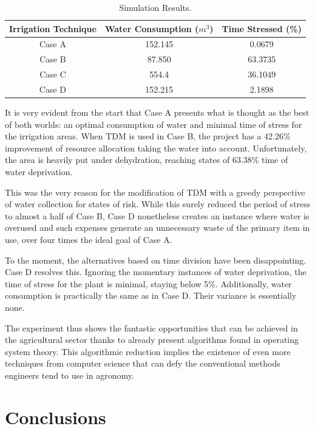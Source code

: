 \documentclass[12pt]{article}
\begin{document}
\begin{table}[ht]
\centering

\begin{tabular}{|c||c|c|}
\hline
Irrigation Technique & Water Consumption ($m^3$) & Time Stressed (\%)\\
\hline \hline
Case A & 152.145 & 0.0679 \\
\hline
Case B & 87.850 & 63.3735 \\
\hline
Case C & 554.4 & 36.1049 \\
\hline
Case D & 152.215 & 2.1898 \\
\hline
\end{tabular}

\caption{Simulation Results.}
\label{tab:results}
\end{table}

It is very evident from the start that Case A presents what is thought as the best of both worlds: an optimal consumption of water and minimal time of stress for the irrigation areas. When TDM is used in Case B, the project has a 42.26\% improvement of resource allocation taking the water into account. Unfortunately, the area is heavily put under dehydration, reaching states of 63.38\% time of water deprivation. 

This was the very reason for the modification of TDM with a greedy perspective of water collection for states of risk. While this surely reduced the period of stress to almost a half of Case B, Case D nonetheless creates an instance where water is overused and such expenses generate an unnecessary waste of the primary item in use, over four times the ideal goal of Case A.

To the moment, the alternatives based on time division have been disappointing. Case D resolves this. Ignoring the momentary instances of water deprivation, the time of stress for the plant is minimal, staying below 5\%. Additionally, water consumption is practically the same as in Case D. Their variance is essentially none.

The experiment thus shows the fantastic opportunities that can be achieved in the agricultural sector thanks to already present algorithms found in operating system theory. This algorithmic reduction implies the existence of even more techniques from computer science that can defy the conventional methods engineers tend to use in agronomy. 

\section{Conclusions}
\end{document}
